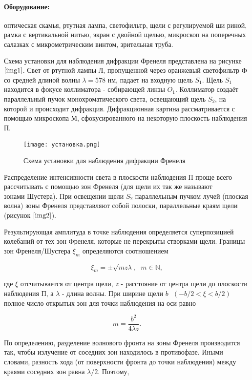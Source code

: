 \documentclass[a4paper,12pt]{article} %
\begin{document}
\paragraph{Оборудование:} оптическая скамья, ртутная лампа, светофильтр, щели с регулируемой ши риной, рамка с вертикальной нитью, экран с двойной щелью, микроскоп на поперечных салазках с микрометрическим винтом, зрительная труба.

Схема установки для наблюдения дифракции Френеля представлена на рисунке $\ref{img1}$. Свет от ртутной лампы Л, пропущенной через оранжевый светофильтр Ф со средней длиной волны $\lambda = 578 \text{ нм}$, падает на входную щель $S_1$.
Щель $S_1$ находится в фокусе $\text{коллиматора}$ - собирающей линзы $O_1$. Коллиматор создаёт параллельный пучок монохроматического света, освещающий щель $S_2$, на которой и происходит дифракция. Дифракционная картина рассматривается с помощью микроскопа М, сфокусированного на некоторую плоскость наблюдения П.

\begin{figure}[h]
\begin{center}
    \texttt{[image: установка.png]}
\end{center}
    \caption{Схема установки для наблюдения дифракции Френеля}
    \label{img1}
\end{figure}

Распределение интенсивности света в плоскости наблюдения П проще всего рассчитывать с помощью $\text{зон Френеля}$ (для щели их так же называют $\text{зонами Шустера}$). При освещении щели $S_2$ параллельным пучком лучей (плоская волна) зоны Френеля представляют собой полоски, параллельные краям щели (рисунок $\ref{img2}$). 

Результирующая амплитуда в точке наблюдения определяется суперпозицией колебаний от тех зон Френеля, которые не перекрыты створками щели. Границы зон Френеля/Шустера $\xi_m$ определяются соотношением

\[ \xi_m = \pm\sqrt{mz\lambda}, \text{ } m \in \mathbb{N}, \]

где $\xi$ отсчитывается от центра щели, $z$ - расстояние от центра щели до плоскости наблюдения $\text{П}$, а $\lambda$ - длина волны. При ширине щели $b\text{ }(-b/2<\xi<b/2)$ полное число открытых зон для точки наблюдения на оси равно

\[ m=\frac{b^2}{4\lambda z}. \]


По определению, разделение волнового фронта на зоны Френеля производится так, чтобы излучение от соседних зон находилось в $\text{противофазе}$. Иными словами, разность хода (от поверхности фронта до точки наблюдения) между краями соседних зон равна $\lambda/2$. Поэтому, 
\end{document}
